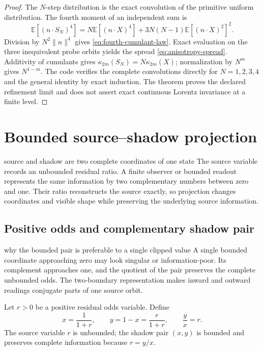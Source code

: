 \documentclass[11pt]{article}
\numberwithin{equation}{section}
\theoremstyle{remark}
\begin{document}
\begin{proof}
The $N$-step distribution is the exact convolution of the primitive uniform distribution. The fourth moment of an independent sum is
\begin{equation}
\mathbb E[(n\cdot S_N)^4]
=N\mathbb E[(n\cdot X)^4]+3N(N-1)\mathbb E[(n\cdot X)^2]^2.
\end{equation}
Division by $N^2\|n\|^4$ gives \eqref{eq:fourth-cumulant-law}. Exact evaluation on the three inequivalent probe orbits yields the spread \eqref{eq:anisotropy-spread}. Additivity of cumulants gives $\kappa_{2m}(S_N)=N\kappa_{2m}(X)$; normalization by $N^m$ gives $N^{1-m}$. The code verifies the complete convolutions directly for $N=1,2,3,4$ and the general identity by exact induction. The theorem proves the declared refinement limit and does not assert exact continuous Lorentz invariance at a finite level.
\end{proof}

\section{Bounded source--shadow projection}
\begin{conceptledger}{source and shadow are two complete coordinates of one state}
The source variable records an unbounded residual ratio. A finite observer or bounded readout represents the same information by two complementary numbers between zero and one. Their ratio reconstructs the source exactly, so projection changes coordinates and visible shape while preserving the underlying source information.
\end{conceptledger}

\label{sec:shadow}

\subsection{Positive odds and complementary shadow pair}
\begin{interpretivebridge}{why the bounded pair is preferable to a single clipped value}
A single bounded coordinate approaching zero may look singular or information-poor. Its complement approaches one, and the quotient of the pair preserves the complete unbounded odds. The two-boundary representation makes inward and outward readings conjugate parts of one source orbit.
\end{interpretivebridge}

Let $r>0$ be a positive residual odds variable. Define
\begin{equation}
 x=\frac1{1+r},\qquad y=1-x=\frac{r}{1+r},\qquad \frac yx=r.
\end{equation}
The source variable $r$ is unbounded; the shadow pair $(x,y)$ is bounded and preserves complete information because $r=y/x$.
\end{document}
